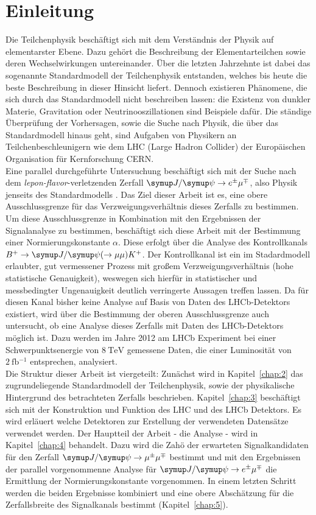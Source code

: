 \chapter{Einleitung}
%
Die Teilchenphysik beschäftigt sich mit dem Verständnis der Physik auf elementarster Ebene. Dazu gehört die Beschreibung der Elementarteilchen sowie deren Wechselwirkungen untereinander. Über die letzten Jahrzehnte ist dabei das sogenannte Standardmodell der Teilchenphysik entstanden, welches bis heute die beste Beschreibung in dieser Hinsicht liefert. Dennoch existieren Phänomene, die sich durch das Standardmodell nicht beschreiben lassen: die Existenz von dunkler Materie, Gravitation oder Neutrinooszillationen sind Beispiele dafür. Die ständige Überprüfung der Vorhersagen, sowie die Suche nach Physik, die über das Standardmodell hinaus geht, sind Aufgaben von Physikern an Teilchenbeschleunigern wie dem LHC (Large Hadron Collider) der Europäischen Organisation für Kernforschung CERN. \\
Eine parallel durchgeführte Untersuchung beschäftigt sich mit der Suche nach dem \textit{lepon-flavor}-verletzenden Zerfall $\signal$, also Physik jenseits des Standardmodells \cite{ba-maik}. Das Ziel dieser Arbeit ist es, eine obere Ausschlussgrenze für das Verzweigungsverhältnis dieses Zerfalls zu bestimmen. Um diese Ausschlussgrenze in Kombination mit den Ergebnissen der Signalanalyse zu bestimmen, beschäftigt sich diese Arbeit mit der Bestimmung einer Normierungskonstante $\alpha$. Diese erfolgt über die Analyse des Kontrollkanals $B^{+}\rightarrow\jpsi(\rightarrow\mu\mu)K^{+}$. Der Kontrollkanal ist ein im Stadardmodell erlaubter, gut vermessener Prozess mit großem Verzweigungsverhältnis (hohe statistische Genauigkeit), weswegen sich hierfür in statistischer und messbedingter Ungenauigkeit deutlich verringerte Aussagen treffen lassen. Da für diesen Kanal bisher keine Analyse auf Basis von Daten des LHCb-Detektors existiert, wird über die Bestimmung der oberen Ausschlussgrenze auch untersucht, ob eine Analyse dieses Zerfalls mit Daten des LHCb-Detektors möglich ist.
Dazu werden im Jahre 2012 am LHCb Experiment bei einer Schwerpunktsenergie von $\SI{8}{\tera\electronvolt}$ gemessene Daten, die einer Luminosität von $\SI{2}{\femto\barn^{-1}}$ entsprechen, analysiert. \\
Die Struktur dieser Arbeit ist viergeteilt: Zunächst wird in Kapitel~\ref{chap:2} das zugrundeliegende Standardmodell der Teilchenphysik, sowie der physikalische Hintergrund des betrachteten Zerfalls beschrieben. Kapitel~\ref{chap:3} beschäftigt sich mit der Konstruktion und Funktion des LHC und des LHCb Detektors. Es wird erläuert welche Detektoren zur Erstellung der verwendeten Datensätze verwendet werden. Der Hauptteil der Arbeit - die Analyse - wird in Kapitel~\ref{chap:4} behandelt. Dazu wird die Zahö der erwarteten Signalkandidaten für den Zerfall $\kontroll$ bestimmt und mit den Ergebnissen der parallel vorgenommenne Analyse für $\signal$ die Ermittlung der Normierungskonstante vorgenommen. In einem letzten Schritt werden die beiden Ergebnisse kombiniert und eine obere Abschätzung für die Zerfallsbreite des Signalkanals bestimmt (Kapitel~\ref{chap:5}).
